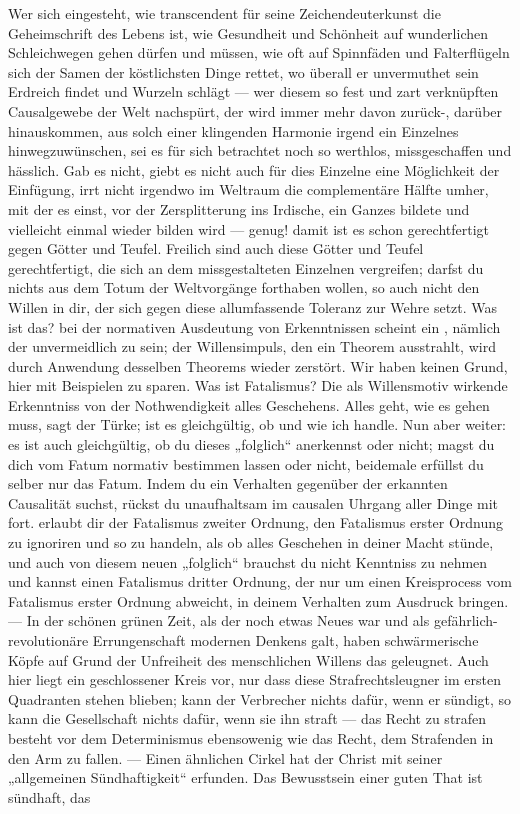 Wer sich eingesteht, wie transcendent für seine Zeichendeuterkunst die Geheimschrift des Lebens ist, wie Gesundheit und Schönheit auf wunderlichen Schleichwegen gehen dürfen und müssen, wie oft auf Spinnfäden und Falterflügeln sich der Samen der köstlichsten Dinge rettet, wo überall er unvermuthet sein Erdreich findet und Wurzeln schlägt — wer diesem so fest und zart verknüpften Causalgewebe der Welt nachspürt, der wird immer mehr davon zurück-, darüber hinauskommen, aus solch einer klingenden Harmonie irgend ein Einzelnes hinwegzuwünschen, sei es für sich betrachtet noch so werthlos, missgeschaffen und hässlich. Gab es nicht, giebt es nicht auch für dies Einzelne eine Möglichkeit der Einfügung, irrt nicht irgendwo im Weltraum die complementäre Hälfte umher, mit der es einst, vor der Zersplitterung ins Irdische, ein Ganzes bildete und vielleicht einmal wieder bilden wird — genug! damit ist es schon gerechtfertigt gegen Götter und Teufel. Freilich sind auch diese Götter und Teufel gerechtfertigt, die sich an dem missgestalteten Einzelnen vergreifen; darfst du nichts aus dem Totum der Weltvorgänge forthaben wollen, so auch nicht den Willen in dir, der sich gegen diese allumfassende Toleranz zur Wehre setzt. Was ist das? bei der normativen Ausdeutung von Erkenntnissen scheint ein , nämlich der  unvermeidlich zu sein; der Willensimpuls, den ein Theorem ausstrahlt, wird durch  Anwendung desselben Theorems wieder zerstört. Wir haben keinen Grund, hier mit Beispielen zu sparen. Was ist Fatalismus? Die als Willensmotiv wirkende Erkenntniss von der Nothwendigkeit alles Geschehens. Alles geht, wie es gehen muss, sagt der Türke;  ist es gleichgültig, ob und wie ich handle. Nun aber weiter: es ist auch gleichgültig, ob du dieses „folglich“ anerkennst oder nicht; magst du dich vom Fatum normativ bestimmen lassen oder nicht, beidemale erfüllst du selber nur das Fatum. Indem du ein Verhalten gegenüber der erkannten Causalität suchst, rückst du unaufhaltsam im causalen Uhrgang aller Dinge mit fort.  erlaubt dir der Fatalismus zweiter Ordnung, den Fatalismus erster Ordnung zu ignoriren und so zu handeln, als ob alles Geschehen in deiner Macht stünde, und auch von diesem neuen „folglich“ brauchst du nicht Kenntniss zu nehmen und kannst einen Fatalismus dritter Ordnung, der nur um einen Kreisprocess vom Fatalismus erster Ordnung abweicht, in deinem Verhalten zum Ausdruck bringen. — In der schönen grünen Zeit, als der  noch etwas Neues war und als gefährlich-revolutionäre Errungenschaft modernen Denkens galt, haben schwärmerische Köpfe auf Grund der Unfreiheit des menschlichen Willens das  geleugnet. Auch hier liegt ein geschlossener Kreis vor, nur dass diese Strafrechtsleugner im ersten Quadranten stehen blieben; kann der Verbrecher nichts dafür, wenn er sündigt, so kann die Gesellschaft nichts dafür, wenn sie ihn straft — das Recht zu strafen besteht vor dem Determinismus ebensowenig wie das Recht, dem Strafenden in den Arm zu fallen. — Einen ähnlichen Cirkel hat der Christ mit seiner „allgemeinen Sündhaftigkeit“ erfunden. Das Bewusstsein einer guten That ist sündhaft, das 